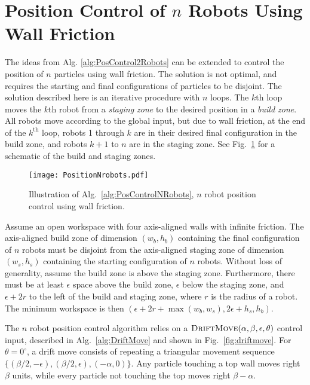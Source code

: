 

\section{Position Control of $n$ Robots Using Wall Friction}\label{sec:PostionControlnRobots}
The ideas from Alg. \ref{alg:PosControl2Robots}  can be extended to control the position of $n$ particles using wall friction.
The solution is not optimal, and requires the starting and final configurations of particles to be disjoint.
The solution described here is an iterative procedure with $n$ loops. 
 The $k$th loop moves the $k$th robot from a \emph{staging zone} to the desired position in a \emph{build zone}. 
  All robots move according to the global input, but due to wall friction, at the end of the $k^{\text{th}}$ loop, robots 1 through $k$ are in their desired final configuration in the build zone, and robots $k+1$ to $n$ are in the staging zone. 
   See Fig.~\ref{fig:simulationNrobot} for a schematic of the build and staging zones.

\begin{figure}
\begin{center}
	\texttt{[image: PositionNrobots.pdf]}
\end{center}
\vspace{-1em}
\caption{\label{fig:simulationNrobot}
Illustration of Alg.\ \ref{alg:PosControlNRobots}, $n$ robot position control  using wall friction.
}
\end{figure}

Assume an open workspace with four axis-aligned walls with infinite friction.
The axis-aligned build zone of dimension $(w_b, h_b)$ containing the final configuration of $n$ robots must be disjoint from the axis-aligned staging zone of dimension $(w_s, h_s)$  containing the starting configuration of $n$ robots.
 Without loss of generality, assume the build zone  is above the staging zone. 
Furthermore, there must be at least $\epsilon$ space above the build zone, $\epsilon$ below the staging zone, and $\epsilon + 2r$ to the left of the build and staging zone, where $r$ is the radius of a robot.  The minimum workspace is then $(\epsilon + 2r + \max(w_b,w_s), 2\epsilon + h_s,h_b)$.

The $n$ robot position control algorithm relies on a $\text{\sc DriftMove}(\alpha, \beta, \epsilon,\theta)$ control input, described in Alg.~\ref{alg:DriftMove} and shown in Fig.\  \ref{fig:driftmove}.
For $\theta = 0^\circ$, a drift move consists of repeating a triangular movement sequence $\{ (\beta/2,-\epsilon),(\beta/2,\epsilon),(-\alpha,0)\}$. 
 Any particle touching a top wall moves right $\beta$ units, while every particle not touching the top moves right $\beta-\alpha$.

